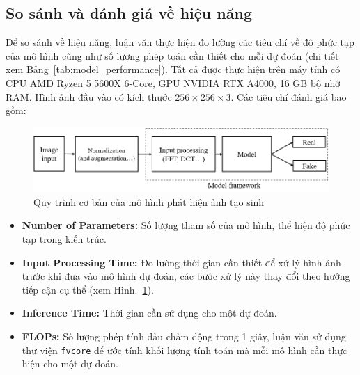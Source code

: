 \subsection{So sánh và đánh giá về hiệu năng}
%
%
Để so sánh về hiệu năng, luận văn thực hiện đo lường các tiêu chí về độ phức tạp của mô hình cũng như số lượng phép toán cần thiết cho mỗi dự đoán (chi tiết xem Bảng~\ref{tab:model_performance}). Tất cả được thực hiện trên máy tính có CPU AMD Ryzen 5 5600X 6-Core, GPU NVIDIA RTX A4000, 16 GB bộ nhớ RAM. Hình ảnh đầu vào có kích thước $256 \times 256 \times 3$. Các tiêu chí đánh giá bao gồm:
%
\begin{figure}[ht!]
	\includegraphics[width=\textwidth]{Images/figure_pine_line_1.png}
	\caption{Quy trình cơ bản của mô hình phát hiện ảnh tạo sinh}	
	\label{figure_pine_line_1}
\end{figure}
%
%
\begin{itemize}
	\item \textbf{Number of Parameters:} Số lượng tham số của mô hình, thể hiện độ phức tạp trong kiến trúc.
	\item \textbf{Input Processing Time:} Đo lường thời gian cần thiết để xử lý hình ảnh trước khi đưa vào mô hình dự đoán, các bước xử lý này thay đổi theo hướng tiếp cận cụ thể (xem Hình.~\ref{figure_pine_line_1}).
	\item \textbf{Inference Time:} Thời gian cần sử dụng cho một dự đoán.
	\item \textbf{FLOPs:} Số lượng phép tính dấu chấm động trong 1 giây, luận văn sử dụng thư viện \texttt{fvcore} để ước tính khối lượng tính toán mà mỗi mô hình cần thực hiện cho một dự đoán.
\end{itemize}
%
%





